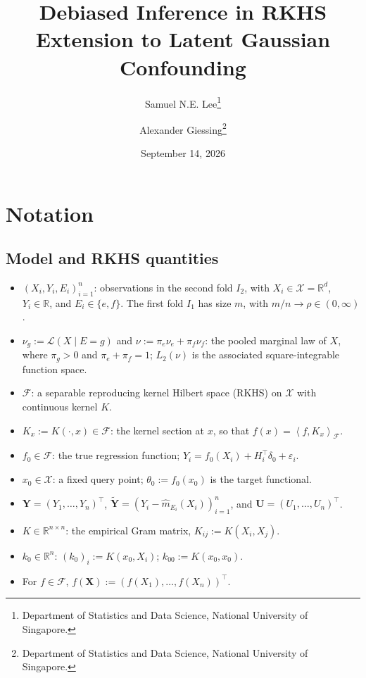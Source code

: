 \documentclass[11pt]{article}
\newcommand{\R}{\mathbb{R}}
\newcommand{\F}{\mathcal{F}}
\newcommand{\X}{\mathcal{X}}
\newcommand{\eps}{\varepsilon}
\newcommand{\inner}[2]{\left\langle #1,#2\right\rangle}
\begin{document}
\title{\textbf{Debiased Inference in RKHS}\\[4pt]\large Extension to Latent Gaussian Confounding}
\author{Samuel N.E. Lee\thanks{Department of Statistics and Data Science, National University of Singapore.} \and Alexander Giessing\thanks{Department of Statistics and Data Science, National University of Singapore.}}
\date{September 14, 2026}
\maketitle
\tableofcontents
\newpage

\section{Notation}

\subsection*{Model and RKHS quantities}
\begin{itemize}[leftmargin=2em]
  \item $(X_i,Y_i,E_i)_{i=1}^n$: observations in the second fold $I_2$, with $X_i\in\X=\R^d$, $Y_i\in\R$, and $E_i\in\{e,f\}$. The first fold $I_1$ has size $m$, with $m/n\to\rho\in(0,\infty)$.
  \item $\nu_g:=\mathcal L(X\mid E=g)$ and $\nu:=\pi_e\nu_e+\pi_f\nu_f$: the pooled marginal law of $X$, where $\pi_g>0$ and $\pi_e+\pi_f=1$; $L_2(\nu)$ is the associated square-integrable function space.
  \item $\F$: a separable reproducing kernel Hilbert space (RKHS) on $\X$ with continuous kernel $K$.
  \item $K_x:=K(\cdot,x)\in\F$: the kernel section at $x$, so that $f(x)=\inner{f}{K_x}_{\F}$.
  \item $f_0\in\F$: the true regression function; $Y_i=f_0(X_i)+H_i^\top\delta_0+\eps_i$.
  \item $x_0\in\X$: a fixed query point; $\theta_0:=f_0(x_0)$ is the target functional.
  \item $\bm Y=(Y_1,\ldots,Y_n)^\top$, $\widetilde{\bm Y}=(Y_i-\widehat m_{E_i}(X_i))_{i=1}^n$, and $\bm U=(U_1,\ldots,U_n)^\top$.
  \item $K\in\R^{n\times n}$: the empirical Gram matrix, $K_{ij}:=K(X_i,X_j)$.
  \item $k_0\in\R^n$: $(k_0)_i:=K(x_0,X_i)$; $k_{00}:=K(x_0,x_0)$.
  \item For $f\in\F$, $f(\bm X):=(f(X_1),\ldots,f(X_n))^\top$.
\end{itemize}
\end{document}
